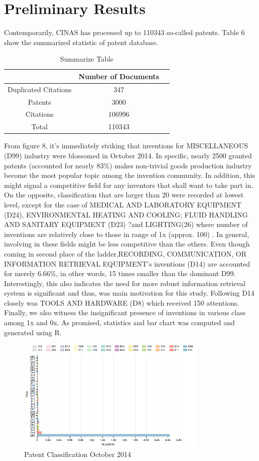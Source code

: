 \documentclass{sig-alternate}
\begin{document}
{\section{Preliminary Results}
Contemporarily, CINAS has processed up to 110343 so-called patents. Table 6 show the summarized statistic of patent database.
\begin{table}[!htd]
\begin{tabular}{|c|c|l|} \hline
 &Number of Documents\\ \hline
 Duplicated Citations&347 \\ \hline
Patents&3000 \\ \hline
Citations&106996 \\ \hline
Total & 110343\\ \hline
\end{tabular}
\caption{Summarize Table}
\end{table}

From figure 8, it's immediately striking that inventions for MISCELLANEOUS (D99) industry were blossomed in October 2014. In specific, nearly 2500 granted patents (accounted for nearly 83\%) makes non-trivial goods production industry become the most popular topic among the invention community. In addition, this might signal a competitive field for any inventors that shall want to take part in. On the opposite, classification that are larger than 20 were recorded at lowest level, except for the case of  MEDICAL AND LABORATORY EQUIPMENT (D24), ENVIRONMENTAL HEATING AND COOLING; FLUID HANDLING AND SANITARY EQUIPMENT (D23)
?and LIGHTING(26) where number of inventions are relatively close to those in range of 1x (approx. 100) . In general, involving in these fields might be less competitive than the others. Even though coming in second place of the ladder,RECORDING, COMMUNICATION, OR INFORMATION RETRIEVAL EQUIPMENT's inventions (D14) are accounted for merely 6.66\%, in other words, 15 times smaller than the dominant D99. Interestingly, this also indicates the need for more robust information retrieval system is significant and thus, was main motivation for this study. Following D14 closely was TOOLS AND HARDWARE (D8) which received 150 attentions. Finally, we  also witness the insignificant presence of inventions in various class among 1x and 0x. As promised, statistics and bar chart was computed and generated using R. 
\begin{figure}[htb]
\centering
\includegraphics[width=90mm]{rplot-classification.png}
\caption{ Patent Classification October 2014 }
\end{figure}

}
\end{document}
